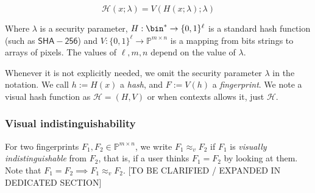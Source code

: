 \documentclass{article}
\newcommand{\bb}{\mathbb}
\newcommand{\vis}{\approx_v}
\newcommand{\pp}{\bb P}
\newcommand{\pmn}{\pp^{m \times n}}
\newcommand{\hh}{\mathcal H}
\begin{document}
$$\hh(x;\lambda) = V(H(x;\lambda);\lambda)$$

Where $\lambda$ is a security parameter, $H : \bin^* \rightarrow \{0,1\}^\ell$ is a standard hash function (such as $\mathsf{SHA-256}$) and $V : \{0,1\}^\ell \rightarrow \mathbb{P}^{m\times n}$ is a mapping from bits strings to arrays of pixels.
The values of $\ell,m,n$ depend on the value of $\lambda$. 

Whenever it is not explicitly needed, we omit the security parameter $\lambda$ in the notation. We call $h := H(x)$ a \textit{hash}, and $F := V(h)$ a \textit{fingerprint}. We note a visual hash function as $\hh = (H,V)$ or when contexts allows it, just $\hh$. 

\subsubsection{Visual indistinguishability}
For two fingerprints $F_1, F_2 \in \pmn$, we write $ F_1 \vis F_2$ if $F_1$ is \textit{visually indistinguishable} from $F_2$, that is, if a user thinks $F_1 = F_2$ by looking at them. Note that $F_1 = F_2 \implies F_1 \vis F_2$. [TO BE CLARIFIED / EXPANDED IN DEDICATED SECTION]
\end{document}
